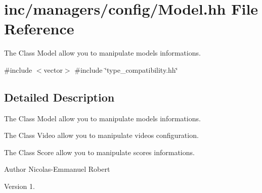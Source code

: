 \hypertarget{Model_8hh}{}\section{inc/managers/config/\+Model.hh File Reference}
\label{Model_8hh}


The Class Model allow you to manipulate model\textquotesingle{}s informations.  


{\ttfamily \#include $<$vector$>$}\newline
{\ttfamily \#include \char`\"{}type\+\_\+compatibility.\+hh\char`\"{}}\newline


\subsection{Detailed Description}
The Class Model allow you to manipulate model\textquotesingle{}s informations. 

The Class Video allow you to manipulate video\textquotesingle{}s configuration.

The Class Score allow you to manipulate score\textquotesingle{}s informations.

\begin{DoxyAuthor}{Author}
Nicolas-\/\+Emmanuel Robert 
\end{DoxyAuthor}
\begin{DoxyVersion}{Version}
1. 
\end{DoxyVersion}
